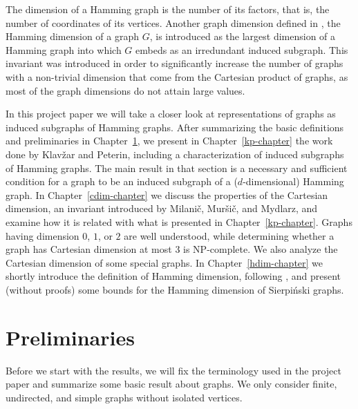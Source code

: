 \documentclass[12pt,a4paper,titlepage,openany]{report}
\begin{document}
The dimension of a Hamming graph is the number of its factors, that is, the number of coordinates of its vertices. Another graph dimension defined in \cite{Sandi}, the Hamming dimension of a graph $G$, is introduced as the largest dimension of a Hamming graph into which $G$ embeds as an irredundant induced subgraph. This invariant was introduced in order to significantly increase the number of graphs with a non-trivial dimension that come from the Cartesian product of graphs, as most of the graph dimensions do not attain large values.

In this project paper we will take a closer look at representations of graphs as induced subgraphs of Hamming graphs.  After summarizing the basic definitions and preliminaries in Chapter~\ref{chapter-prelim}, we present in Chapter~\ref{kp-chapter} the work done by Klav\v zar and Peterin, including a characterization of induced subgraphs of Hamming graphs. The main result in that section is a necessary and sufficient condition for a graph to be an induced subgraph of a ($d$-dimensional) Hamming graph. In Chapter~\ref{cdim-chapter} we discuss the properties of the Cartesian dimension, an invariant introduced by Milani\v c, Mur\v si\v c, and Mydlarz, and examine how it is related with what is presented in Chapter~\ref{kp-chapter}. Graphs having dimension $0$, $1$, or $2$ are well understood, while determining whether a graph has Cartesian dimension at most 3 is NP-complete. We also analyze the Cartesian dimension of some special graphs. In Chapter~\ref{hdim-chapter} we shortly introduce the definition of Hamming dimension, following \cite{Sandi}, and present (without proofs) some bounds for the Hamming dimension of Sierpi\'nski graphs.


\chapter{Preliminaries}\label{chapter-prelim}
\thispagestyle{fancy}

Before we start with the results, we will fix the terminology used in the project paper and summarize some basic result about graphs. We only consider finite, undirected, and simple graphs without isolated vertices.
\end{document}
